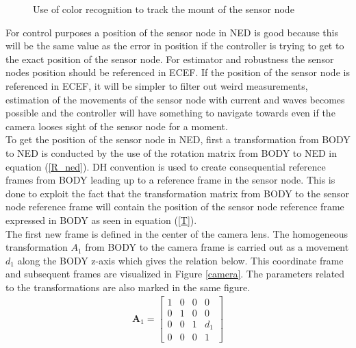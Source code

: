 \begin{figure}[H]
{}
\centering
{}
\caption{Use of color recognition to track the mount of the sensor node}
\label{color}
\end{figure}\noindent
For control purposes a position of the sensor node in NED is good because this will be the same value as the error in position if the controller is trying to get to the exact position of the sensor node. For estimator and robustness the sensor nodes position should be referenced in ECEF. If the position of the sensor node is referenced in ECEF, it will be simpler to filter out weird measurements, estimation of the movements of the sensor node with current and waves becomes possible and the controller will have something to navigate towards even if the camera looses sight of the sensor node for a moment.\\\newline
To get the position of the sensor node in NED, first a transformation from BODY to NED is conducted by the use of the rotation matrix from BODY to NED in equation (\ref{R_ned}). DH convention is used to create consequential reference frames from BODY leading up to a reference frame in the sensor node. This is done to exploit the fact that the transformation matrix from BODY to the sensor node reference frame will contain the position of the sensor node reference frame expressed in BODY as seen in equation (\ref{T}).\\\newline
The first new frame is defined in the center of the camera lens. The homogeneous transformation $A_1$ from BODY to the camera frame is carried out as a movement $d_1$ along the BODY z-axis which gives the relation below. This coordinate frame and subsequent frames are visualized in Figure \ref{camera}. The parameters related to the transformations are also marked in the same figure.
\begin{eqnarray}
\boldsymbol{A}_1 = \begin{bmatrix}
1 & 0 & 0 & 0\\
0 & 1 & 0 & 0\\
0 & 0 & 1 & d_1\\
0 & 0 & 0 & 1
\end{bmatrix}
\end{eqnarray}
